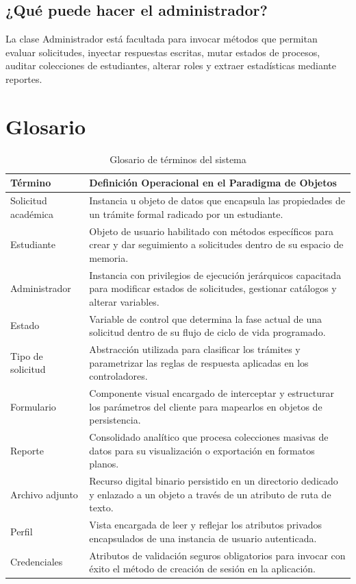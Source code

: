 \documentclass[12pt,letterpaper]{article}
\begin{document}
\subsection*{¿Qué puede hacer el administrador?}
La clase Administrador está facultada para invocar métodos que permitan evaluar solicitudes, inyectar respuestas escritas, mutar estados de procesos, auditar colecciones de estudiantes, alterar roles y extraer estadísticas mediante reportes.

\section{Glosario}

\begin{longtable}{L{0.30\textwidth}L{0.63\textwidth}}
\caption{Glosario de términos del sistema}\\
\toprule
\textbf{Término} & \textbf{Definición Operacional en el Paradigma de Objetos} \\
\midrule
Solicitud académica & Instancia u objeto de datos que encapsula las propiedades de un trámite formal radicado por un estudiante. \\
Estudiante & Objeto de usuario habilitado con métodos específicos para crear y dar seguimiento a solicitudes dentro de su espacio de memoria. \\
Administrador & Instancia con privilegios de ejecución jerárquicos capacitada para modificar estados de solicitudes, gestionar catálogos y alterar variables. \\
Estado & Variable de control que determina la fase actual de una solicitud dentro de su flujo de ciclo de vida programado. \\
Tipo de solicitud & Abstracción utilizada para clasificar los trámites y parametrizar las reglas de respuesta aplicadas en los controladores. \\
Formulario & Componente visual encargado de interceptar y estructurar los parámetros del cliente para mapearlos en objetos de persistencia. \\
Reporte & Consolidado analítico que procesa colecciones masivas de datos para su visualización o exportación en formatos planos. \\
Archivo adjunto & Recurso digital binario persistido en un directorio dedicado y enlazado a un objeto a través de un atributo de ruta de texto. \\
Perfil & Vista encargada de leer y reflejar los atributos privados encapsulados de una instancia de usuario autenticada. \\
Credenciales & Atributos de validación seguros obligatorios para invocar con éxito el método de creación de sesión en la aplicación. \\
\bottomrule
\end{longtable}
\end{document}

